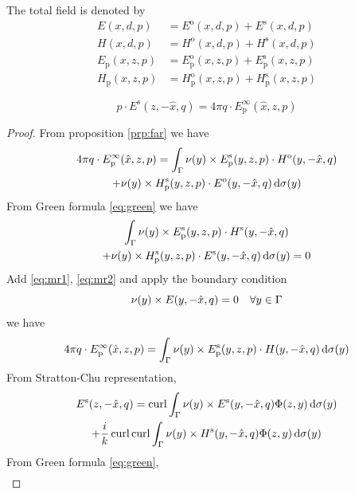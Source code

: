 The total field is denoted by 
\begin{align*}
  E(x, d, p) &= E^\text{o}(x, d, p) + E^\text{s}(x, d, p)\\
  H(x, d, p) &= H^\text{o}(x, d, p) + H^\text{s}(x, d, p) \\
  E_\text{p}(x, z, p) &= E_\text{p}^\text{o}(x, z, p) + E_\text{p}^\text{s}(x, z, p)\\
  H_\text{p}(x, z, p) &= H_\text{p}^\text{o}(x, z, p) + H_\text{p}^\text{s}(x, z, p)
\end{align*}

\begin{thm}
  $$p\cdot E^\text{s}(z, -\hat{x}, q) = 4\pi q\cdot E_\text{p}^\infty(\hat{x}, z, p)$$ 
\end{thm}

\begin{proof}
  From proposition \eqref{prp:far} we have
  \begin{multline}\label{eq:mr1}
    4\pi q\cdot E_\text{p}^\infty(\hat{x}, z, p) = \int_{\Gamma}\nu(y)\times E_\text{p}^\text{s}(y, z, p)\cdot H^\text{o}(y, -\hat{x}, q) \\+ \nu(y)\times H_\text{p}^\text{s}(y, z, p)\cdot E^\text{o}(y, -\hat{x}, q)\,\text{d}\sigma(y) 
  \end{multline}
  From Green formula \eqref{eq:green} we have
  \begin{multline}\label{eq:mr2}
    \int_{\Gamma}\nu(y)\times E_\text{p}^\text{s}(y, z, p)\cdot H^\text{s}(y, -\hat{x}, q) \\+ \nu(y)\times H_\text{p}^\text{s}(y, z, p)\cdot E^\text{s}(y, -\hat{x}, q)\,\text{d}\sigma(y) = 0 
  \end{multline}
  Add \eqref{eq:mr1}, \eqref{eq:mr2} and apply the boundary condition $$\nu(y)\times E(y, -\hat{x}, q)=0\quad\forall y\in\Gamma$$ we have
  \begin{align}\label{eq:mr3}
    4\pi q\cdot E_\text{p}^\infty(\hat{x}, z, p)= \int_{\Gamma}\nu(y)\times E_\text{p}^\text{s}(y, z, p)\cdot H(y, -\hat{x}, q)\,\text{d}\sigma(y) 
  \end{align}
  From Stratton-Chu representation,  
  \begin{multline}\label{eq:mr4}
    E^\text{s}(z, -\hat{x}, q) = \operatorname{curl}\int_{\Gamma}\nu(y)\times E^\text{s}(y, -\hat{x}, q)\Phi(z, y)\,\text{d}\sigma(y)\\+\frac{i}{k}\operatorname{curl}\operatorname{curl}\int_{\Gamma}\nu(y)\times H^\text{s}(y, -\hat{x}, q)\Phi(z, y)\,\text{d}\sigma(y)
  \end{multline}
  From Green formula \eqref{eq:green},
  \begin{multline}\label{eq:mr5}

\end{multline}
\end{proof}
